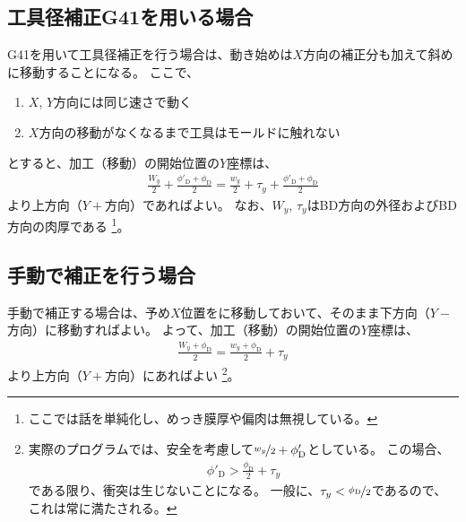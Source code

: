 \subsection{工具径補正G41を用いる場合}
G41を用いて工具径補正を行う場合は、動き始めは$X$方向の補正分も加えて斜めに移動することになる。
ここで、
\begin{enumerate}
\item $X$, $Y$方向には同じ速さで動く
\item $X$方向の移動がなくなるまで工具はモールドに触れない
\end{enumerate}
とすると、加工（移動）の開始位置の$Y$座標は、
\begin{align*}
  \frac{W_y}2+\frac{\phi'_\mathrm D+\phi_\mathrm D}2
  = \frac{w_y}2+\tau_y+\frac{\phi'_\mathrm D+\phi_\mathrm D}2
\end{align*}
より上方向（$Y+$方向）であればよい。
なお、$W_y$, $\tau_y$はBD方向の外径およびBD方向の肉厚である
\footnote{ここでは話を単純化し、めっき膜厚や偏肉は無視している。}。



\subsection{手動で補正を行う場合}
手動で補正する場合は、予め$X$位置をに移動しておいて、そのまま下方向（$Y-$方向）に移動すればよい。
よって、加工（移動）の開始位置の$Y$座標は、
\begin{align*}
  \frac{W_y+\phi_\mathrm D}2 = \frac{w_y+\phi_\mathrm D}2+\tau_y
\end{align*}
より上方向（$Y+$方向）にあればよい%
\footnote{実際のプログラムでは、安全を考慮して$\nicefrac{w_y}2+\phi'_\mathrm D$としている。
この場合、
\begin{align*}
  \phi'_\mathrm D > \frac{\phi_\mathrm D}2+\tau_y
\end{align*}
である限り、衝突は生じないことになる。
一般に、$\tau_y < \nicefrac{\phi_\mathrm D}2$であるので、これは常に満たされる。}。





